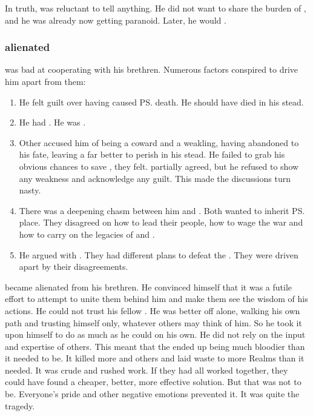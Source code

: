 In truth, \Ishnaruchaefir{} was reluctant to tell \Secherdamon{} anything. 
He did not want to share the burden of , and he was already now getting paranoid.
Later, he would . 





\subsubsection{\Ishnaruchaefir{} alienated}
\Ishnaruchaefir{} was bad at cooperating with his brethren. 
Numerous factors conspired to drive him apart from them: 
\begin{enumerate}
  \item 
    He felt guilt over having caused \ps{\Nexagglachel} death. 
    He should have died in his stead. 
  \item 
    He had . 
    He was . 
  \item 
    Other \dragons{} accused him of being a coward and a weakling, having abandoned \Nexagglachel{} to his fate, leaving a far better \dragon{} to perish in his stead. 
    He failed to grab his obvious chances to save \Nexagglachel, they felt. 
    \Ishnaruchaefir{} partially agreed, but he refused to show any weakness and acknowledge any guilt. 
    This made the discussions turn nasty. 
  \item 
    There was a deepening chasm between him and \Secherdamon. 
    Both wanted to inherit \ps{\Nexagglachel} place. 
    They disagreed on how to lead their people, how to wage the war and how to carry on the legacies of \Nexagglachel{} and \Kserasshana. 
  \item 
    He argued with \Rystessakhin{}. 
    They had different plans to defeat the \resphain. 
    They were driven apart by their disagreements. 
\end{enumerate}

\Ishnaruchaefir{} became alienated from his \draconic{} brethren. 
He convinced himself that it was a futile effort to attempt to unite them behind him and make them see the wisdom of his actions. 
He could not trust his fellow \dragons. 
He was better off alone, walking his own path and trusting himself only, whatever others may think of him. 
So he took it upon himself to do as much as he could on his own. 
He did not rely on the input and expertise of others.
This meant that the \SecondShrouding{} ended up being much bloodier than it needed to be. 
It killed more \dragons{} and others and laid waste to more Realms than it needed. 
It was crude and rushed work. 
If they had all worked together, they could have found a cheaper, better, more effective solution. 
But that was not to be. 
Everyone's pride and other negative emotions prevented it. 
It was quite the tragedy. 

